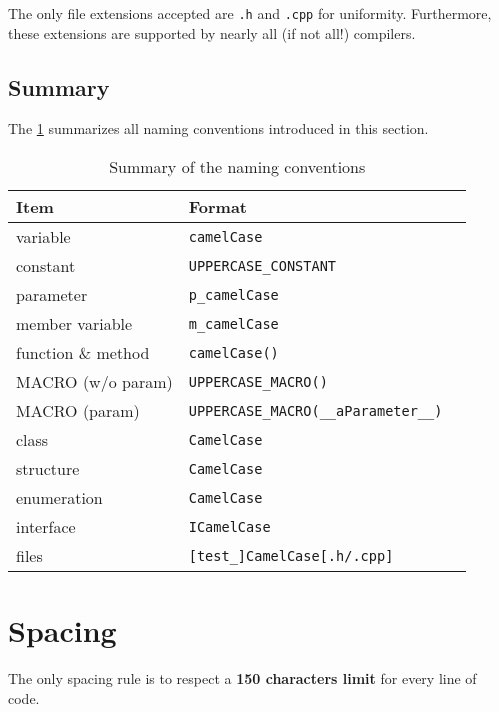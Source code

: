   
The only file extensions accepted are \texttt{.h} and \texttt{.cpp} for 
uniformity. Furthermore, these extensions are supported by nearly all (if not 
all!) compilers.
  
\subsection{Summary}

The \cref{tblNamingConventions} summarizes all naming conventions introduced in 
this section.

\begin{table}
  \begin{tabular}{|l|l|l|}
    \hline
    \textbf{Item}              & \textbf{Format}                              \\
    \hline\hline
    variable                   & \texttt{camelCase}                           \\
    constant                   & \texttt{UPPERCASE\_CONSTANT}                 \\
    parameter                  & \texttt{p\_camelCase}                        \\
    member variable            & \texttt{m\_camelCase}                        \\
    function \& method         & \texttt{camelCase()}                         \\
    MACRO (w/o param)          & \texttt{UPPERCASE\_MACRO()}                  \\
    MACRO (param)              & \texttt{UPPERCASE\_MACRO(\_\_aParameter\_\_)}\\
    class                      & \texttt{CamelCase}                           \\
    structure                  & \texttt{CamelCase}                           \\
    enumeration                & \texttt{CamelCase}                           \\
    interface                  & \texttt{ICamelCase}                          \\
    files                      & \texttt{[test\_]CamelCase[.h/.cpp]}          \\
    \hline
  \end{tabular} 
  \caption{Summary of the naming conventions}
  \label{tblNamingConventions}
\end{table} 

\section{Spacing}

The only spacing rule is to respect a \textbf{150 characters limit} for every
line of code.